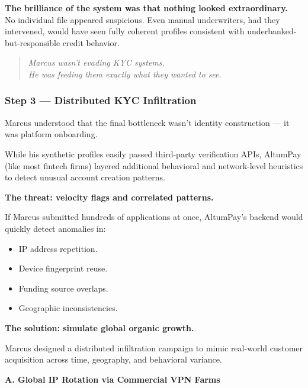 \medskip

\textbf{The brilliance of the system was that nothing looked extraordinary.} \\
No individual file appeared suspicious. Even manual underwriters, had they intervened, would have seen fully coherent profiles consistent with underbanked-but-responsible credit behavior.

\medskip

\begin{quote}
\textit{Marcus wasn’t evading KYC systems.} \\
\textit{He was feeding them exactly what they wanted to see.}
\end{quote}


\medskip

\subsubsection*{Step 3 --- Distributed KYC Infiltration}

Marcus understood that the final bottleneck wasn’t identity construction --- it was platform onboarding.

While his synthetic profiles easily passed third-party verification APIs, AltumPay (like most fintech firms) layered additional behavioral and network-level heuristics to detect unusual account creation patterns.

\medskip

\textbf{The threat: velocity flags and correlated patterns.}

If Marcus submitted hundreds of applications at once, AltumPay’s backend would quickly detect anomalies in:

\begin{itemize}
    \item IP address repetition.
    \item Device fingerprint reuse.
    \item Funding source overlaps.
    \item Geographic inconsistencies.
\end{itemize}

\textbf{The solution: simulate global organic growth.}

Marcus designed a distributed infiltration campaign to mimic real-world customer acquisition across time, geography, and behavioral variance.

\medskip

\textbf{A. Global IP Rotation via Commercial VPN Farms}

